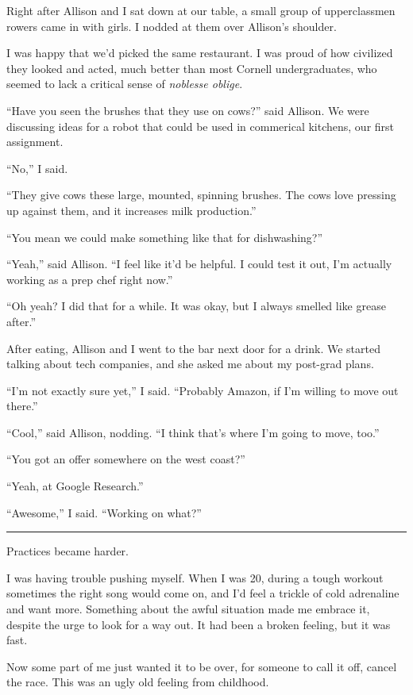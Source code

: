 Right after Allison and I sat down at our table, a small group of upperclassmen
rowers came in with girls.  I nodded at them over Allison's shoulder.  

I was happy that we'd picked the same restaurant.  I was proud of how civilized
they looked and acted, much better than most Cornell undergraduates, who seemed
to lack a critical sense of \textit{noblesse oblige}.

``Have you seen the brushes that they use on cows?'' said Allison.  We were
discussing ideas for a robot that could be used in commerical kitchens, our
first assignment.

``No,'' I said.

``They give cows these large, mounted, spinning brushes. The cows love pressing
up against them, and it increases milk production.'' 

``You mean we could make something like that for dishwashing?''

``Yeah,'' said Allison.  ``I feel like it'd be helpful.  I could test it out,
I'm actually working as a prep chef right now.''

``Oh yeah?  I did that for a while.  It was okay, but I always smelled like
grease after.''

After eating, Allison and I went to the bar next door for a drink.  We started
talking about tech companies, and she asked me about my post-grad plans.  

``I'm not exactly sure yet,'' I said.  ``Probably Amazon, if I'm willing to move
out there.''

``Cool,'' said Allison, nodding.  ``I think that's where I'm going to move,
too.''

``You got an offer somewhere on the west coast?''

``Yeah, at Google Research.''

``Awesome,'' I said.  ``Working on what?''

\plainfancybreak{12pt}{2}{* * *}

Practices became harder.

I was having trouble pushing myself.  When I was 20, during a tough workout
sometimes the right song would come on, and I'd feel a trickle of cold
adrenaline and want more.  Something about the awful situation made me embrace
it, despite the urge to look for a way out.  It had been a broken feeling, but
it was fast.

Now some part of me just wanted it to be over, for someone to call it off,
cancel the race.  This was an ugly old feeling from childhood.

